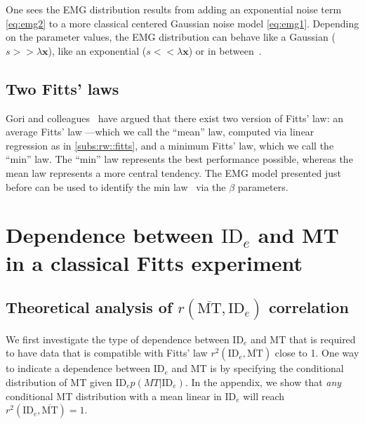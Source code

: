 \documentclass[manuscript,review,anonymous]{acmart}
\newcommand{\mmt}{\ensuremath{\overline{\text{MT}}}\xspace}
\newcommand{\ide}{\ensuremath{{\text{ID}_e}}\xspace}
\begin{document}
One sees the EMG distribution results from adding an exponential noise term \autoref{eq:emg2} to a more classical centered Gaussian noise model \autoref{eq:emg1}.
Depending on the parameter values, the EMG distribution can behave like a Gaussian ($s >> \lambda \mathbf{x}$), like an exponential ($s << \lambda \mathbf{x}$) or in between~\cite{gori2019}.


\subsection{Two Fitts' laws}
Gori and colleagues~\cite{gori2017,gori2018tochi} have argued that there exist two version of Fitts' law: an average Fitts' law ---which we call the ``mean''  law, computed via linear regression as in \autoref{subs:rw::fitts}, and a minimum Fitts' law, which we call the ``min'' law. The ``min'' law represents the best performance possible, whereas the mean law represents a more central tendency. The EMG model presented just before can be used to identify the min law~\cite{gori2019} via the $\beta$ parameters.






\section{Dependence between \ide and MT in a classical Fitts experiment \label{sec:jgp}}

\subsection{Theoretical analysis of $r(\mmt, \ide)$ correlation \label{subs:theory_rsq}}
We first investigate the type of dependence between $\ide$ and MT that is required to have data that is compatible with Fitts' law \ie $r^2(\ide, \mmt)$ close to 1. One way to indicate a dependence between \ide and MT is by specifying the conditional distribution of MT given \ide $p(MT | \ide)$.
In \hypertarget{res:method_2__correlation}{the appendix}, we show that \emph{any} conditional MT distribution with a mean linear in \ide will reach $r^2(\ide, \mmt) = 1$.
\end{document}
